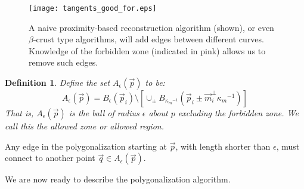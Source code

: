 \documentclass{article}
\newtheorem{definition}[cntr]{Definition}
\numberwithin{cntr}{section}
\numberwithin{equation}{section}
\newcommand{\vp}[0]{{\vec{p}}}
\newcommand{\vq}[0]{{\vec{q}}}
\newcommand{\vm}[0]{{\vec{m}}}
\newcommand{\ball}[2]{ { B_{#1}(#2) } }
\newcommand{\allowed}[2]{ { A_{#1}(#2) } }
\newcommand{\curvemax}{{\kappa_{m}}}
\newcommand{\curvemaxi}{{\curvemax^{-1}}}
\begin{document}
\begin{figure}
\setlength{\unitlength}{0.240900pt}
\ifx\plotpoint\undefined\newsavebox{\plotpoint}\fi
\sbox{\plotpoint}{\rule[-0.200pt]{0.400pt}{0.400pt}}%
\texttt{[image: tangents\_good\_for.eps]}

\caption{A naive proximity-based reconstruction algorithm (shown), or even $\beta$-crust type algorithms, will add edges between different curves. Knowledge of the forbidden zone (indicated in pink) allows us to remove such edges.}
\label{fig:proximityVsTangentBased}
\end{figure}

\begin{definition}
  Define the set $\allowed{\epsilon}{\vp}$ to be:
  \begin{equation}
    \label{eq:allowedRegion}
    \allowed{\epsilon}{\vp}=\ball{\epsilon}{\vp_{i}} \setminus \left[ \cup_{\pm} \ball{\curvemaxi}{\vp_{i} \pm \vm_{i}^{\perp} \curvemaxi} \right]
  \end{equation}
  That is, $\allowed{\epsilon}{\vp}$ is the ball of radius $\epsilon$ about $p$ excluding the forbidden zone.  We call this the \emph{allowed zone} or \emph{allowed region}.
\end{definition}
Any edge in the polygonalization starting at $\vp$, with length shorter than $\epsilon$, must connect to another point $\vq \in \allowed{\epsilon}{\vp}$.

We are now ready to describe the polygonalization algorithm.
\end{document}
